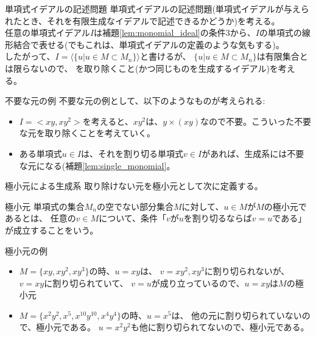 \begin{frame} {単項式イデアルの記述問題}
	単項式イデアルの記述問題(単項式イデアルが与えられたとき、それを有限生成なイデアルで記述できるかどうか)を考える。\\
	任意の単項式イデアル$I$は補題\ref{lem:monomial_ideal}の条件3から、$I$の単項式の線形結合で表せる(でもこれは、単項式イデアルの定義のような気もする)。\\
	したがって、$I=\langle \{u | u \in M \subset M_n \} \rangle$と書けるが、
	$\{u | u \in M \subset M_n \}$は有限集合とは限らないので、
	を取り除くこと(かつ同じものを生成するイデアル)を考える。\\
	\begin{exampleblock} {不要な元の例}
		不要な元の例として、以下のようなものが考えられる:
		\begin{itemize}
			\item $I=<xy, xy^2>$を考えると、$xy^2$は、$y \times (xy)$なので不要。こういった不要な元を取り除くことを考えていく。
			\item ある単項式$u \in I$は、それを割り切る単項式$v \in I$があれば、生成系には不要な元になる(補題\ref{lem:single_monomial}。
		\end{itemize}
	\end{exampleblock}
\end{frame}

\begin{frame} {極小元による生成系}
	取り除けない元を極小元として次に定義する。
	\begin{definition} {極小元}
		単項式の集合$M_n$の空でない部分集合$M$に対して、$u \in M$が$M$の極小元であるとは、
		任意の$v \in M$について、条件「$v$が$u$を割り切るならば$v=u$である」が成立することをいう。
	\end{definition}
	\begin{exampleblock} {極小元の例}
		\begin{itemize}
			\item $M = \{xy, xy^2, xy^3\}$の時、$u=xy$は、
			      $v=xy^2, xy^3$に割り切られないが、$v=xy$に割り切られていて、
									$v=u$が成り立っているので、$u=xy$は$M$の極小元
			\item $M = \{x^2y^2, x^5, x^10y^10, x^4y^4\}$の時、$u=x^5$は、
			他の元に割り切られていないので、極小元である。
			      $u=x^2y^2$も他に割り切られてないので、極小元である。
		\end{itemize}
	\end{exampleblock}
\end{frame}

